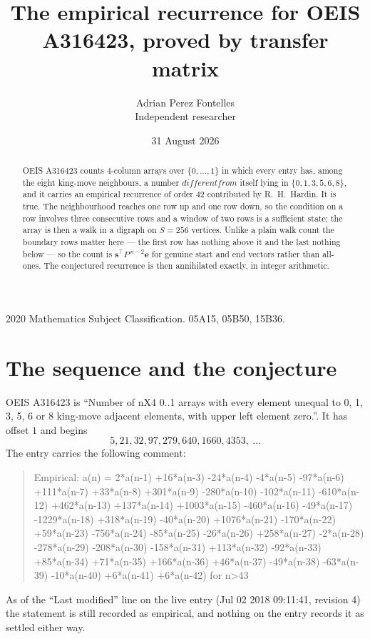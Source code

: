 \documentclass[11pt,a4paper]{article}
\title{The empirical recurrence for OEIS A316423, proved by transfer matrix}
\author{Adrian Perez Fontelles\\ \small Independent researcher}
\date{31 August 2026}
\theoremstyle{plain}
\theoremstyle{definition}
\begin{document}
\maketitle

\begin{abstract}
OEIS A316423 counts $4$-column arrays over $\{0,\dots,1\}$ in which every entry has,
among the eight king-move neighbours, a number $different from$ itself lying in $\{0,1,3,5,6,8\}$, and it carries an empirical
recurrence of order $42$ contributed by R.~H.~Hardin. It is true. The neighbourhood
reaches one row up and one row down, so the condition on a row involves three consecutive
rows and a window of two rows is a sufficient state; the array is then a walk in a digraph
on $S=256$ vertices. Unlike a plain walk count the boundary rows matter here --- the first
row has nothing above it and the last nothing below --- so the count is
$\mathbf{s}^{\!\top}P^{\,n-2}\mathbf{e}$ for genuine start and end vectors rather than
all-ones. The conjectured recurrence is then annihilated exactly, in integer arithmetic.
\end{abstract}

\noindent\small 2020 Mathematics Subject Classification. 05A15, 05B50, 15B36.\normalsize

\section{The sequence and the conjecture}

OEIS A316423 is ``Number of nX4 0..1 arrays with every element unequal to 0, 1, 3, 5, 6 or 8 king-move adjacent elements, with upper left element zero.''. It has offset
$1$ and begins
\[
5, 21, 32, 97, 279, 640, 1660, 4353,\ \dots
\]
The entry carries the following comment:
\begin{quote}\small
Empirical: a(n) = 2*a(n-1) +16*a(n-3) -24*a(n-4) -4*a(n-5) -97*a(n-6) +111*a(n-7) +33*a(n-8) +301*a(n-9) -280*a(n-10) -102*a(n-11) -610*a(n-12) +462*a(n-13) +137*a(n-14) +1003*a(n-15) -460*a(n-16) -49*a(n-17) -1229*a(n-18) +318*a(n-19) -40*a(n-20) +1076*a(n-21) -170*a(n-22) +59*a(n-23) -756*a(n-24) -85*a(n-25) -26*a(n-26) +258*a(n-27) -2*a(n-28) -278*a(n-29) -208*a(n-30) -158*a(n-31) +113*a(n-32) -92*a(n-33) +85*a(n-34) +71*a(n-35) +166*a(n-36) +46*a(n-37) -49*a(n-38) -63*a(n-39) -10*a(n-40) +6*a(n-41) +6*a(n-42) for n>43
\end{quote}
As of the ``Last modified'' line on the live entry (Jul 02 2018 09:11:41, revision
4) the statement is still recorded as empirical, and nothing on the entry
records it as settled either way.
\end{document}
